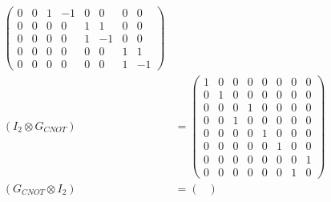 \documentclass[10pt]{article}
\theoremstyle{definition}
\begin{document}
\begin{align*}
\begin{pmatrix}
                                                                                                     0 & 0  & 1 & -1 & 0 & 0  & 0 & 0  \\
                                                                                                     0 & 0  & 0 & 0  & 1 & 1  & 0 & 0  \\
                                                                                                     0 & 0  & 0 & 0  & 1 & -1 & 0 & 0  \\
                                                                                                     0 & 0  & 0 & 0  & 0 & 0  & 1 & 1  \\
                                                                                                     0 & 0  & 0 & 0  & 0 & 0  & 1 & -1
                                                                                                   \end{pmatrix} \\
  (I_2 \otimes G_{CNOT})                                                      & =\begin{pmatrix}
                                                                                   1 & 0 & 0 & 0 & 0 & 0 & 0 & 0 \\
                                                                                   0 & 1 & 0 & 0 & 0 & 0 & 0 & 0 \\
                                                                                   0 & 0 & 0 & 1 & 0 & 0 & 0 & 0 \\
                                                                                   0 & 0 & 1 & 0 & 0 & 0 & 0 & 0 \\
                                                                                   0 & 0 & 0 & 0 & 1 & 0 & 0 & 0 \\
                                                                                   0 & 0 & 0 & 0 & 0 & 1 & 0 & 0 \\
                                                                                   0 & 0 & 0 & 0 & 0 & 0 & 0 & 1 \\
                                                                                   0 & 0 & 0 & 0 & 0 & 0 & 1 & 0
                                                                                 \end{pmatrix}                       \\
  (G_{CNOT}\otimes I_2)                                                       & =\begin{pmatrix}

\end{pmatrix}
\end{align*}
\end{document}
